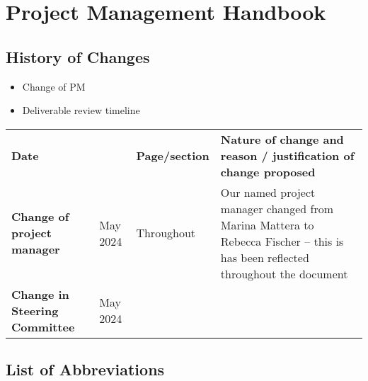 \documentclass[
]{article}
\author{}
\date{\vspace{-2.5em}2024-05-31}
\providecommand{\tightlist}{%
  \setlength{\itemsep}{0pt}\setlength{\parskip}{0pt}}
\begin{document}
{
\setcounter{tocdepth}{2}
\tableofcontents
}
\hypertarget{project-management-handbook}{%
\section{\texorpdfstring{\textbf{Project Management Handbook}}{Project Management Handbook}}\label{project-management-handbook}}

\hypertarget{history-of-changes}{%
\subsection{History of Changes}\label{history-of-changes}}

\begin{itemize}
\tightlist
\item
  Change of PM\\
\item
  Deliverable review timeline
\end{itemize}

\begin{longtable}[]{@{}
  >{\raggedright\arraybackslash}p{}
  >{\raggedright\arraybackslash}p{}
  >{\raggedright\arraybackslash}p{}
  >{\raggedright\arraybackslash}p{}@{}}
\toprule()
\endhead
\textbf{Date} & & \textbf{Page/section} & \textbf{Nature of change and reason / justification of change proposed} \\
\textbf{Change of project manager} & 07 May 2024 & Throughout & Our named project manager changed from Marina Mattera to Rebecca Fischer -- this is has been reflected throughout the document \\
\textbf{Change in Steering Committee} & 07 May 2024 & & \\
\bottomrule()
\end{longtable}

\hypertarget{list-of-abbreviations}{%
\subsection{List of Abbreviations}\label{list-of-abbreviations}}
\end{document}
